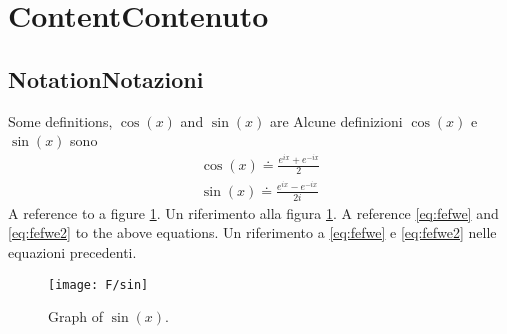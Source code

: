 \section{\ifCDLeng Content\fi \ifCDLita Contenuto\fi}

\subsection{\ifCDLeng Notation\fi \ifCDLita Notazioni\fi}

\begin{Defn}
  \label{defn:1}
  \CDLeng Some definitions, $\cos(x)$ and \(\sin(x)\) are
  \CDLita Alcune definizioni $\cos(x)$ e \(\sin(x)\) sono
  \begin{eqnarray}
    \cos(x) \doteq \frac{e^{ix}+e^{-ix}}{2}  \label{eq:fefwe} \\
    \sin(x) \doteq \frac{e^{ix}-e^{-ix}}{2i} \label{eq:fefwe2}
  \end{eqnarray}
  \CDLeng A reference to a figure \ref{fig:a354}.
  \CDLita Un riferimento alla figura   \ref{fig:a354}.
  \CDLeng A reference \eqref{eq:fefwe} and  \eqref{eq:fefwe2} to the above equations.
  \CDLita Un riferimento a \eqref{eq:fefwe} e  \eqref{eq:fefwe2} nelle equazioni precedenti.
\end{Defn}



\begin{figure}[ht]\label{fig:a354}
  \begin{center}
    \texttt{[image: F/sin]}
    \caption{Graph of \(\sin(x)\).}
  \end{center}
\end{figure}




